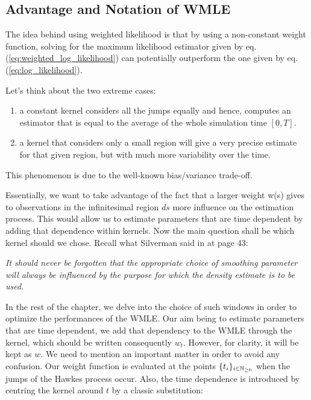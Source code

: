 \subsection{Advantage and Notation of WMLE}

The idea behind using weighted likelihood is that by using a non-constant weight function, solving for the maximum likelihood estimator given by eq. (\ref{eq:weighted_log_likelihood}) can potentially outperform the one given by eq. (\ref{eq:log_likelihood}). 

Let's think about the two extreme cases: 

\begin{enumerate}
\item a constant kernel considers all the jumps equally and hence, computes an estimator that is equal to the average of the whole simulation time $[0,T]$.
\item a kernel that considers only a small region will give a very precise estimate for that given region, but with much more variability over the time.
\end{enumerate}

This phenomenon is due to the well-known bias/variance trade-off.
\label{section:bias-variance_trade-off}

Essentially, we want to take advantage of the fact that a larger weight w(s) gives to observations in the infinitesimal region $ds$ more influence on the estimation process. This would allow us to estimate parameters that are time dependent by adding that dependence within kernels. Now the main question shall be which kernel should we chose. Recall what Silverman said in \cite{Silverman} at page 43:

\vspace{0.5cm}
\textit{It should never be forgotten that the appropriate choice of smoothing parameter will always be influenced by the purpose for which the density estimate is to be used. }
\vspace{0.5cm}


\label{section:kernel_weights_first_conversation}
In the rest of the chapter, we delve into the choice of such windows in order to optimize the performances of the WMLE. Our aim being to estimate parameters that are time dependent, we add that dependency to the WMLE through the kernel, which should be written consequently $w_t$. However, for clarity, it will be kept as $w$. We need to mention an important matter in order to avoid any confusion. Our weight function is evaluated at the points $\{ t_i \}_{ i \in \mathbb{N}_{\geq 0}}$ when the jumps of the Hawkes process occur. Also, the time dependence is introduced by centring the kernel around $t$ by a classic substitution: 

